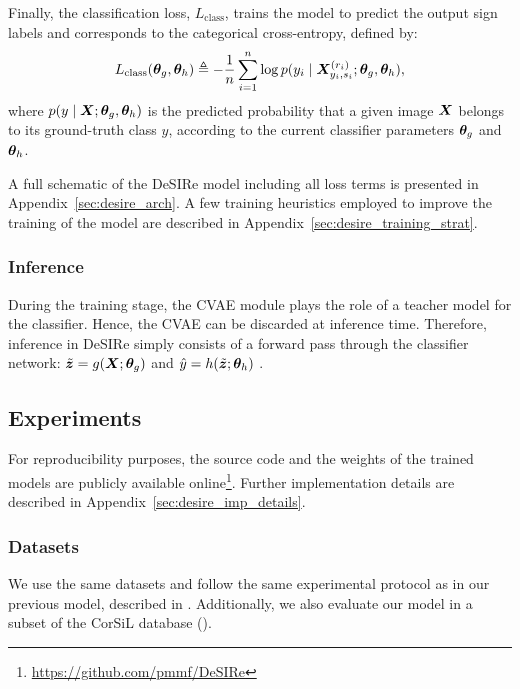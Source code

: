 Finally, the classification loss, $L_{\text{class}}$, trains the model to predict the output sign labels and corresponds to the categorical cross-entropy, defined by:
\begin{equation}
    \label{eq:desire_loss_class}
    L_{\text{class}}({\bm{\theta}}_{g},{\bm{\theta}}_{h}) \triangleq -\frac{1}{n} \sum_{i=1}^{n}\log p(y_{i} \mid {\bm{X}}^{(r_{i})}_{y_{i}, s_{i}};{\bm{\theta}}_{g},{\bm{\theta}}_{h}),
\end{equation}
where $p(y \mid {\bm{X}}; {\bm{\theta}}_{g},{\bm{\theta}}_{h})$ is the predicted probability that a given image ${\bm{X}}$ belongs to its ground-truth class $y$, according to the current classifier parameters ${\bm{\theta}}_{g}$ and ${\bm{\theta}}_{h}$.

A full schematic of the DeSIRe model including all loss terms is presented in Appendix~\ref{sec:desire_arch}. A few training heuristics employed to improve the training of the model are described in Appendix~\ref{sec:desire_training_strat}.

\subsubsection{Inference}
\label{sec:desire_inference}
During the training stage, the CVAE module plays the role of a teacher model for the classifier. Hence, the CVAE can be discarded at inference time. Therefore, inference in DeSIRe simply consists of a forward pass through the classifier network: $\tilde{{\bm{z}}} = g({\bm{X}}; {\bm{\theta}}_g)$ and $\hat{y} = h(\tilde{{\bm{z}}}; {\bm{\theta}}_h)$ .

\subsection{Experiments}
\label{sec:desire_experiments}

For reproducibility purposes, the source code and the weights of the trained models are publicly available online\footnote{\url{https://github.com/pmmf/DeSIRe}}. Further implementation details are described in Appendix~\ref{sec:desire_imp_details}.

\subsubsection{Datasets}
We use the same datasets and follow the same experimental protocol as in our previous model, described in . Additionally, we also evaluate our model in a subset of the CorSiL database (\citet{Ferreira2014}).


